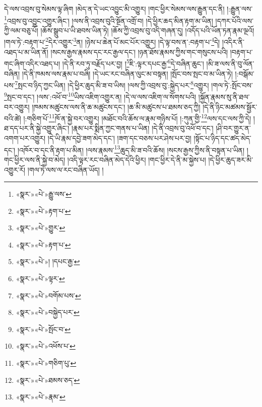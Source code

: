 དེ་ལས་འབྲས་བུ་སེམས་ལྟ་ཞིག །མེད་ན་དེ་ཡང་འབྱུང་མི་འགྱུར། །གང་ཕྱིར་སེམས་ལས་རྒྱུན་དང་ནི། །:རྒྱུན་ལས་\footnote{«སྣར་»«པེ་»རྒྱུ་ལས་}འབྲས་བུ་འབྱུང་འགྱུར་ཞིང་། །ལས་ནི་འབྲས་བུའི་སྔོན་འགྲོ་བ། །དེ་ཕྱིར་ཆད་མིན་རྟག་མ་ཡིན། །དཀར་པོའི་ལས་ཀྱི་ལམ་བཅུ་པོ། །ཆོས་སྒྲུབ་པ་ཡི་ཐབས་ཡིན་ཏེ། །ཆོས་ཀྱི་འབྲས་བུ་འདི་གཞན་དུ། །འདོད་པའི་ཡོན་ཏན་རྣམ་ལྔའོ། །གལ་ཏེ་:བརྟག་པ་\footnote{«སྣར་»«པེ་»རྟག་པ་}དེར་འགྱུར་\footnote{«སྣར་»«པེ་»གྱུར་}ན། །ཉེས་པ་ཆེན་པོ་མང་པོར་འགྱུར། །དེ་ལྟ་བས་ན་:བརྟག་པ་\footnote{«སྣར་»«པེ་»རྟག་པ་}དེ། །འདིར་ནི་འཐད་པ་མ་ཡིན་ནོ། །སངས་རྒྱས་རྣམས་དང་རང་རྒྱལ་དང་། །ཉན་ཐོས་རྣམས་ཀྱིས་གང་གསུངས་པའི། །བརྟག་པ་གང་ཞིག་འདིར་འཐད་པ། །དེ་ནི་རབ་ཏུ་བརྗོད་པར་བྱ། །\footnote{«སྣར་»«པེ་»། །དཔང་རྒྱ་}ཇི་:ལྟར་དཔང་རྒྱ་\footnote{«སྣར་»«པེ་»ལྟར་}དེ་བཞིན་ཆུང་། །མི་ཟ་ལས་ནི་བུ་ལོན་བཞིན། །དེ་ནི་ཁམས་ལས་རྣམ་པ་བཞི། །དེ་ཡང་རང་བཞིན་ལུང་མ་བསྟན། །སྤོང་བས་སྤང་བ་མ་ཡིན་ཏེ། །:བསྒོམ་པས་\footnote{«སྣར་»«པེ་»བགོམ་པས་}སྤང་བ་ཉིད་ཀྱང་ཡིན། །དེ་ཕྱིར་ཆུད་མི་ཟ་བ་ཡིས། །ལས་ཀྱི་འབྲས་བུ་:སྐྱེད་པར་\footnote{«སྣར་»«པེ་»བསྐྱེད་པར་}འགྱུར། །གལ་ཏེ་:སྤོང་བས་\footnote{«སྣར་»«པེ་»སྤོང་བ་}སྤང་བ་དང་། །ལས་:འཕོ་བ་\footnote{«སྣར་»«པེ་»འཕོས་པ་}ཡིས་འཇིག་འགྱུར་ན། །དེ་ལ་ལས་འཇིག་ལ་སོགས་པའི། །སྐྱོན་རྣམས་སུ་ནི་ཐལ་བར་འགྱུར། །ཁམས་མཚུངས་ལས་ནི་ཆ་མཚུངས་དང་། །ཆ་མི་མཚུངས་པ་ཐམས་ཅད་ཀྱི། །དེ་ནི་ཉིང་མཚམས་སྦྱོར་བའི་ཚེ། །:གཅིག་པོ་\footnote{«སྣར་»«པེ་»གཅིག་པུ་}ཁོ་ན་སྐྱེ་བར་འགྱུར། །མཐོང་བའི་ཆོས་ལ་རྣམ་གཉིས་པོ། །:ཀུན་གྱི་\footnote{«སྣར་»«པེ་»ཐམས་ཅད་}ལས་དང་ལས་ཀྱི་དེ། །ཐ་དད་པར་ནི་སྐྱེ་འགྱུར་ཞིང་། །རྣམ་པར་སྨིན་ཀྱང་གནས་པ་ཡིན། །དེ་ནི་འབྲས་བུ་འཕོ་བ་དང་། །ཤི་བར་གྱུར་ན་འགག་པར་འགྱུར། །དེ་ཡི་རྣམ་དབྱེ་ཟག་མེད་དང་། །ཟག་དང་བཅས་པར་ཤེས་པར་བྱ། །སྟོང་པ་ཉིད་དང་ཚད་མེད་དང་། །འཁོར་བ་དང་ནི་རྟག་པ་མིན། །ལས་རྣམས་\footnote{«སྣར་»«པེ་»རྣམ་}ཆུད་མི་ཟ་བའི་ཆོས། །སངས་རྒྱས་ཀྱིས་ནི་བསྟན་པ་ཡིན། །གང་ཕྱིར་ལས་ནི་སྐྱེ་བ་མེད། །འདི་ལྟར་རང་བཞིན་མེད་དེའི་ཕྱིར། །གང་ཕྱིར་དེ་ནི་མ་སྐྱེས་པ། །དེ་ཕྱིར་ཆུད་ཟར་མི་འགྱུར་རོ། །གལ་ཏེ་ལས་ལ་རང་བཞིན་ཡོད། །
